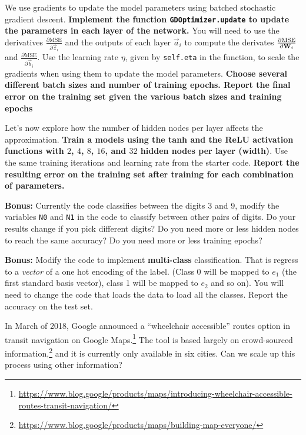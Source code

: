 \documentclass[preview]{standalone}
\begin{document}
\begin{Parts}
\Part We use gradients to update the model parameters using batched stochastic gradient descent.  \textbf{Implement the function \texttt{GDOptimizer.update} to update the parameters in each layer of the network.}  You will need to use the derivatives $\frac{\partial\text{MSE}}{\partial \vec{z}_i}$ and the outputs of each layer $\vec{a}_i$ to compute the derivates $\frac{\partial\text{MSE}}{\partial \mathbf{W}_i}$ and $\frac{\partial\text{MSE}}{\partial \vec{b}_i}$.  Use the learning rate $\eta$, given by \texttt{self.eta} in the function, to scale the gradients when using them to update the model parameters.
\textbf{Choose several different batch sizes  and number of training epochs. Report the final error on the training set given the various batch sizes and training epochs}





\Part Let's now explore how the number of hidden nodes per layer affects the approximation.  \textbf{Train a models using the tanh and the ReLU activation functions with $2$, $4$, $8$, $16$, and $32$ hidden nodes per layer (width)}.  Use the same training iterations and learning rate from the starter code.  \textbf{Report the resulting error on the training set after training for each combination of parameters.}

\Part \textbf{Bonus:} Currently the code classifies between the digits 3 and 9, modify the variables \verb|N0| and \verb|N1| in the code to classify between other pairs of digits. Do your results change if you pick different digits? Do you need more or less hidden nodes to reach the same accuracy? Do you need more or less training epochs?

\Part \textbf{Bonus:} Modify the code to implement \textbf{multi-class} classification. That is regress to a \textit{vector} of a one hot encoding of the label. (Class 0 will be mapped to $e_1$ (the first standard basis vector), class 1 will be mapped to $e_2$ and so on). You will need to change the code that loads the data to
load all the classes. Report the accuracy on the test set.



\end{Parts}

In March of 2018, Google announced a ``wheelchair accessible'' routes option in transit navigation on Google Maps.\footnote{\tiny \url{https://www.blog.google/products/maps/introducing-wheelchair-accessible-routes-transit-navigation/}} The tool is based largely on crowd-sourced information,\footnote{\tiny\url{https://www.blog.google/products/maps/building-map-everyone/}} and it is currently only available in six cities. Can we scale up this process using other information?
\end{document}
